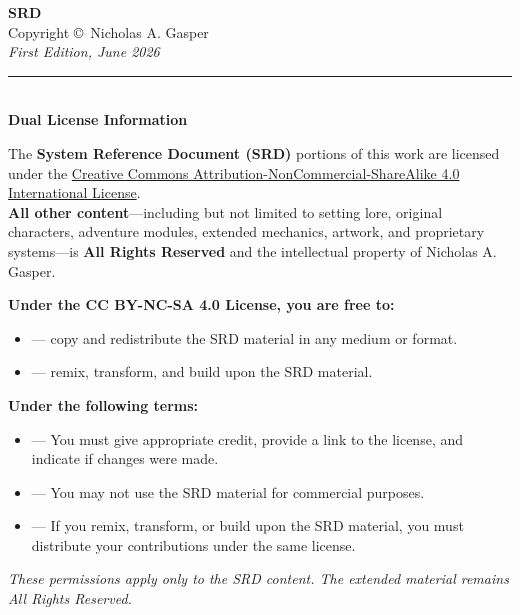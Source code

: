 \cleardoublepage
\thispagestyle{empty}
\begin{center}
  \vspace*{2in}
  {\LARGE\textbf{SRD}}\\[0.3in]
  Copyright \copyright\ Nicholas A. Gasper\\[0.2in]
  \textit{First Edition, June 2026}\\[0.2in]

  \rule{0.6\textwidth}{0.4pt}\\[0.3in]

  \textbf{Dual License Information}\\[0.2in]

  \begin{minipage}{0.9\textwidth}
    \small
    The \textbf{System Reference Document (SRD)} portions of this work are licensed under the
    \href{http://creativecommons.org/licenses/by-nc-sa/4.0/}{Creative Commons Attribution-NonCommercial-ShareAlike 4.0 International License}.\\
    \vspace{0.1in}
    \textbf{All other content}---including but not limited to setting lore, original characters,
    adventure modules, extended mechanics, artwork, and proprietary systems---is
    \textbf{All Rights Reserved} and the intellectual property of Nicholas A. Gasper.
  \end{minipage}

  \vspace{0.3in}

  \begin{minipage}{0.9\textwidth}
    \small
    \textbf{Under the CC BY-NC-SA 4.0 License, you are free to:}
    \begin{itemize}
      \item[\textbf{Share}] --- copy and redistribute the SRD material in any medium or format.
      \item[\textbf{Adapt}] --- remix, transform, and build upon the SRD material.
    \end{itemize}
    \textbf{Under the following terms:}
    \begin{itemize}
      \item[\textbf{Attribution}] --- You must give appropriate credit, provide a link to the license,
            and indicate if changes were made.
      \item[\textbf{NonCommercial}] --- You may not use the SRD material for commercial purposes.
      \item[\textbf{ShareAlike}] --- If you remix, transform, or build upon the SRD material,
            you must distribute your contributions under the same license.
    \end{itemize}
    \textit{These permissions apply only to the SRD content. The extended material remains}
    \textit{All Rights Reserved.}
  \end{minipage}


\end{center}
